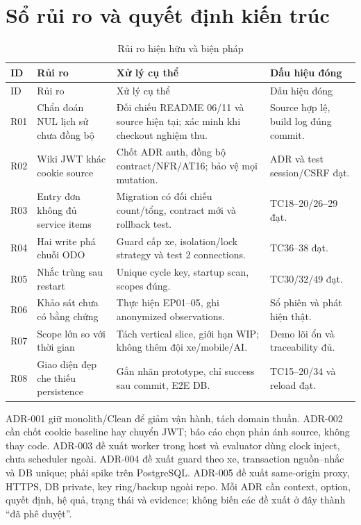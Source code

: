 \section{Sổ rủi ro và quyết định kiến trúc}
\begin{smalltable}\begin{longtable}{L{1cm}L{4.5cm}L{6.7cm}L{2.6cm}}
\caption{Rủi ro hiện hữu và biện pháp}\\\toprule ID & Rủi ro & Xử lý cụ thể & Dấu hiệu đóng\\\midrule\endfirsthead
\toprule ID & Rủi ro & Xử lý cụ thể & Dấu hiệu đóng\\\midrule\endhead
R01 & Chẩn đoán NUL lịch sử chưa đồng bộ & Đối chiếu README 06/11 và source hiện tại; xác minh khi checkout nghiệm thu. & Source hợp lệ, build log đúng commit.\\
R02 & Wiki JWT khác cookie source & Chốt ADR auth, đồng bộ contract/NFR/AT16; bảo vệ mọi mutation. & ADR và test session/CSRF đạt.\\
R03 & Entry đơn không đủ service items & Migration có đối chiếu count/tổng, contract mới và rollback test. & TC18--20/26--29 đạt.\\
R04 & Hai write phá chuỗi ODO & Guard cấp xe, isolation/lock strategy và test 2 connections. & TC36--38 đạt.\\
R05 & Nhắc trùng sau restart & Unique cycle key, startup scan, scopes đúng. & TC30/32/49 đạt.\\
R06 & Khảo sát chưa có bằng chứng & Thực hiện EP01--05, ghi anonymized observations. & Sổ phiên và phát hiện thật.\\
R07 & Scope lớn so với thời gian & Tách vertical slice, giới hạn WIP; không thêm đội xe/mobile/AI. & Demo lõi ổn và traceability đủ.\\
R08 & Giao diện đẹp che thiếu persistence & Gắn nhãn prototype, chỉ success sau commit, E2E DB. & TC15--20/34 và reload đạt.\\\bottomrule
\end{longtable}\end{smalltable}

ADR-001 giữ monolith/Clean để giảm vận hành, tách domain thuần. ADR-002 cần chốt cookie baseline hay chuyển JWT; báo cáo chọn phản ánh source, không thay code. ADR-003 đề xuất worker trong host và evaluator dùng clock inject, chưa scheduler ngoài. ADR-004 đề xuất guard theo xe, transaction nguồn--nhắc và DB unique; phải spike trên PostgreSQL. ADR-005 đề xuất same-origin proxy, HTTPS, DB private, key ring/backup ngoài repo. Mỗi ADR cần context, option, quyết định, hệ quả, trạng thái và evidence; không biến các đề xuất ở đây thành ``đã phê duyệt''.

